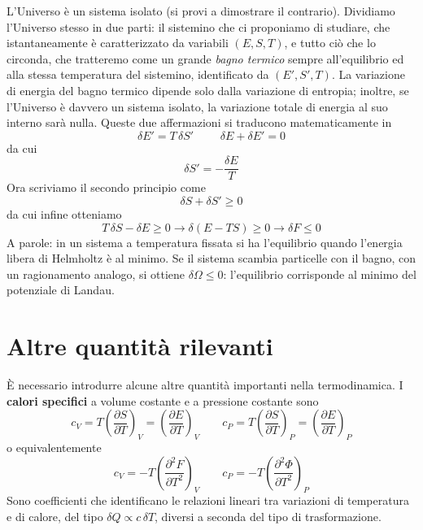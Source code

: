 \documentclass[a4paper]{report}
\begin{document}
L'Universo è un sistema isolato (si provi a dimostrare il contrario). Dividiamo l'Universo stesso in due parti: il sistemino che ci proponiamo di studiare, che istantaneamente è caratterizzato da variabili $(E,S,T)$, e tutto ciò che lo circonda, che tratteremo come un grande \textit{bagno termico} sempre all'equilibrio ed alla stessa temperatura del sistemino, identificato da $(E',S',T)$. La variazione di energia del bagno termico dipende solo dalla variazione di entropia; inoltre, se l'Universo è davvero un sistema isolato, la variazione totale di energia al suo interno sarà nulla. Queste due affermazioni si traducono matematicamente in
\begin{equation}
    \delta E' = T\,\delta S'\qquad \,\, \delta E + \delta E' = 0
\end{equation}
da cui
\begin{equation}
    \delta S' = -\frac{\delta E}{T}
\end{equation}
Ora scriviamo il secondo principio come
\begin{equation}
    \delta S + \delta S' \geq 0
\end{equation}
da cui infine otteniamo
\begin{equation}
    T\,\delta S - \delta E \geq 0 \rightarrow \delta (E-TS) \geq 0 \rightarrow \delta F \leq 0
\end{equation}
A parole: in un sistema a temperatura fissata si ha l'equilibrio quando l'energia libera di Helmholtz è al minimo. Se il sistema scambia particelle con il bagno, con un ragionamento analogo, si ottiene $\delta \Omega \leq 0$: l'equilibrio corrisponde al minimo del potenziale di Landau.

\section{Altre quantità rilevanti}

È necessario introdurre alcune altre quantità importanti nella termodinamica. I \textbf{calori specifici} a volume costante e a pressione costante sono
\begin{equation}
    c_V = T \left(\frac{\partial S}{\partial T}\right)_V = \left(\frac{\partial E}{\partial T}\right)_V \qquad 
    c_P = T \left(\frac{\partial S}{\partial T}\right)_P = \left(\frac{\partial E}{\partial T}\right)_P
\end{equation}
o equivalentemente
\begin{equation}
    c_V = - T\left(\frac{\partial^2F}{\partial T^2}\right)_V \qquad c_P = - T\left(\frac{\partial^2\Phi}{\partial T^2}\right)_P
\end{equation}
Sono coefficienti che identificano le relazioni lineari tra variazioni di temperatura e di calore, del tipo $\delta Q \propto c\,\delta T$, diversi a seconda del tipo di trasformazione. \\
\end{document}
